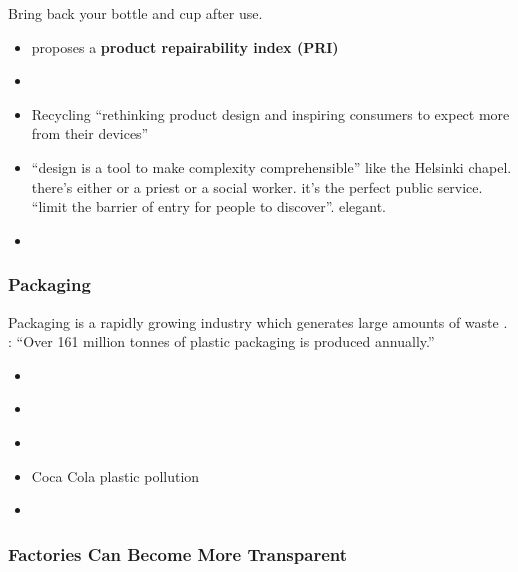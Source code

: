 \documentclass[
  letterpaper,
  DIV=11,
  numbers=noendperiod]{scrartcl}
\providecommand{\tightlist}{%
  \setlength{\itemsep}{0pt}\setlength{\parskip}{0pt}}\usepackage{longtable,booktabs,array}
\begin{document}
Bring back your bottle and cup after use.

\begin{itemize}
\tightlist
\item
  \citet{pastorProposingIntegratedIndicator2023} proposes a
  \textbf{product repairability index (PRI)}
\item
  \citet{formentiniDesignCircularDisassembly2023}
\item
  Recycling \citep{lenovoFastTechUnsustainable2022} ``rethinking product
  design and inspiring consumers to expect more from their devices''
\item
  ``design is a tool to make complexity comprehensible'' like the
  Helsinki chapel. there's either or a priest or a social worker. it's
  the perfect public service. ``limit the barrier of entry for people to
  discover''. elegant.
\item
  \citet{zeynepfalayvonflittnerFalayTransitionDesign}
\end{itemize}

\subsubsection{Packaging}\label{packaging}

Packaging is a rapidly growing industry which generates large amounts of
waste \citet{adaChallengesCircularFood2023}.
\citet{bradleyLiteratureReviewAnalytical2023}: ``Over 161 million tonnes
of plastic packaging is produced annually.''

\begin{itemize}
\tightlist
\item
  \citet{ChallengesOpportunitiesSustainable2022}
\item
  \citet{ProteinBrandsConsumers2022}
\item
  \citet{DetailrichSustainablePackaging2010}
\item
  \citet{lernerHowCocaColaUndermines2019} Coca Cola plastic pollution
\item
  \citet{SulapacReplacingPlastic}
\end{itemize}

\subsubsection{Factories Can Become More
Transparent}\label{factories-can-become-more-transparent}
\end{document}
